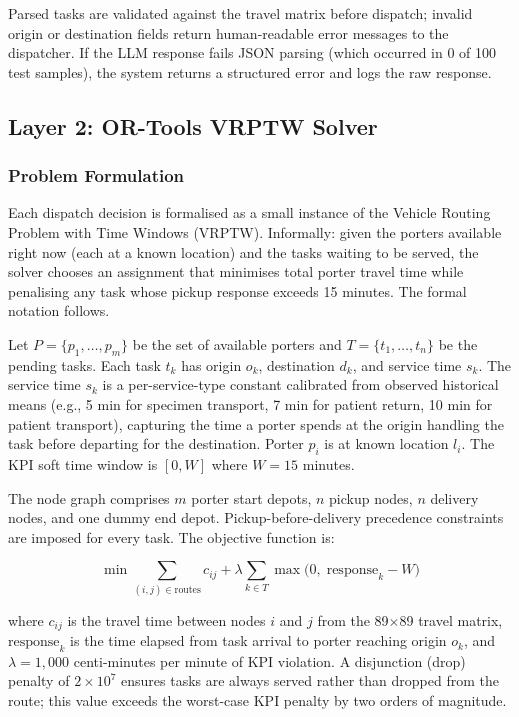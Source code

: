 \documentclass[12pt,a4paper]{article}
\begin{document}
Parsed tasks are validated against the travel matrix before dispatch; invalid origin or destination fields return human-readable error messages to the dispatcher. If the LLM response fails JSON parsing (which occurred in 0 of 100 test samples), the system returns a structured error and logs the raw response.

\subsection{Layer 2: OR-Tools VRPTW Solver}

\subsubsection{Problem Formulation}

Each dispatch decision is formalised as a small instance of the Vehicle Routing Problem with Time Windows (VRPTW). Informally: given the porters available right now (each at a known location) and the tasks waiting to be served, the solver chooses an assignment that minimises total porter travel time while penalising any task whose pickup response exceeds 15 minutes. The formal notation follows.

Let $P = \{p_1, \ldots, p_m\}$ be the set of available porters and $T = \{t_1, \ldots, t_n\}$ be the pending tasks. Each task $t_k$ has origin $o_k$, destination $d_k$, and service time $s_k$. The service time $s_k$ is a per-service-type constant calibrated from observed historical means (e.g., 5 min for specimen transport, 7 min for patient return, 10 min for patient transport), capturing the time a porter spends at the origin handling the task before departing for the destination. Porter $p_i$ is at known location $l_i$. The KPI soft time window is $[0, W]$ where $W = 15$ minutes.

The node graph comprises $m$ porter start depots, $n$ pickup nodes, $n$ delivery nodes, and one dummy end depot. Pickup-before-delivery precedence constraints are imposed for every task. The objective function is:

\begin{equation}
\min \sum_{(i,j) \in \text{routes}} c_{ij} + \lambda \sum_{k \in T} \max\!\bigl (0,\; \text{response}_k - W\bigr)
\label{eq:obj}
\end{equation}

where $c_{ij}$ is the travel time between nodes $i$ and $j$ from the 89$\times$89 travel matrix, $\text{response}_k$ is the time elapsed from task arrival to porter reaching origin $o_k$, and $\lambda = 1{,}000$ centi-minutes per minute of KPI violation. A disjunction (drop) penalty of $2 \times 10^7$ ensures tasks are always served rather than dropped from the route; this value exceeds the worst-case KPI penalty by two orders of magnitude.
\end{document}
